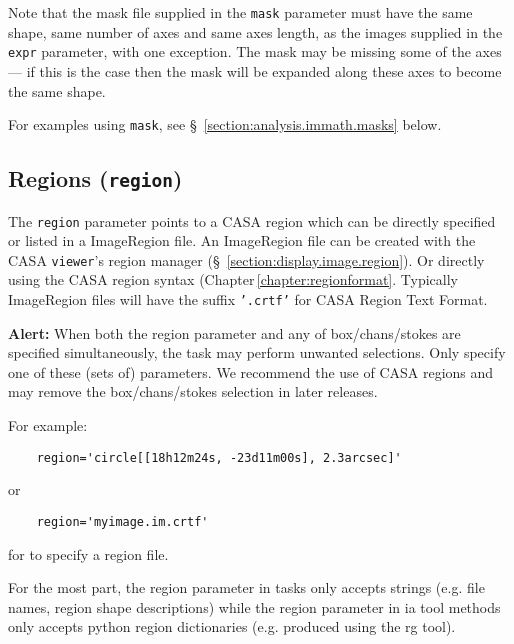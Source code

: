 Note that the mask file supplied in the {\tt mask} parameter must have
the same shape, same number of axes and same axes length, as the
images supplied in the {\tt expr} parameter, with one exception. The mask
may be missing some of the axes --- if this is the case then the mask
will be expanded along these axes to become the same shape.

For examples using {\tt mask}, see \S~\ref{section:analysis.immath.masks} 
below.


\subsection{Regions ({\tt region})}
\label{section:analysis.pars.regions}

The {\tt region} parameter points to a CASA region which can be
directly specified or listed in a ImageRegion file.  An
ImageRegion file can be created with the CASA {\tt viewer}'s region
manager (\S~\ref{section:display.image.region}). Or directly using the
CASA region syntax (Chapter\,\ref{chapter:regionformat}.
Typically ImageRegion files will have the suffix {\tt '.crtf'} for
CASA Region Text Format.  

{\bf Alert:} When both the region parameter and any of
box/chans/stokes are specified simultaneously, the task may perform
unwanted selections. Only specify one of these (sets of)
parameters. We recommend the use of CASA regions and may remove the
box/chans/stokes selection in later releases. 


For example: 
\small
\begin{verbatim}
    region='circle[[18h12m24s, -23d11m00s], 2.3arcsec]'
\end{verbatim}
\normalsize

or

\small
\begin{verbatim}
    region='myimage.im.crtf'
\end{verbatim}
\normalsize

for to specify a region file. 


For the most part, the region parameter in tasks only
accepts strings (e.g. file names, region shape descriptions) while the
region parameter in ia tool methods only accepts python region
dictionaries (e.g. produced using the rg tool).


